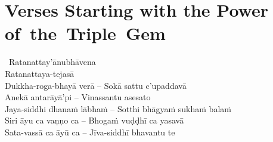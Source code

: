 \section{Verses Starting with the Power \mbox{of}~the~Triple~Gem}
\label{power-of-the-triple-gem}

\begin{pali-hang-together}
  \anglebracketleft\ \hspace{-0.5mm}Ratanattay'ānubhāvena \hspace{-0.5mm}\anglebracketright\ \\
  Ratanattaya-tejasā\\
  Dukkha-roga-bhayā verā – Sokā sattu c'upaddavā\\
  Anekā antarāyā'pi – Vinassantu asesato\\
  Jaya-siddhi dhanaṁ lābhaṁ – Sotthi bhāgyaṁ sukhaṁ balaṁ\\
  Siri āyu ca vaṇṇo ca – Bhogaṁ vuḍḍhī ca yasavā\\
  Sata-vassā ca āyū ca – Jīva-siddhī bhavantu te
\end{pali-hang-together}

\ifninebythirteen


